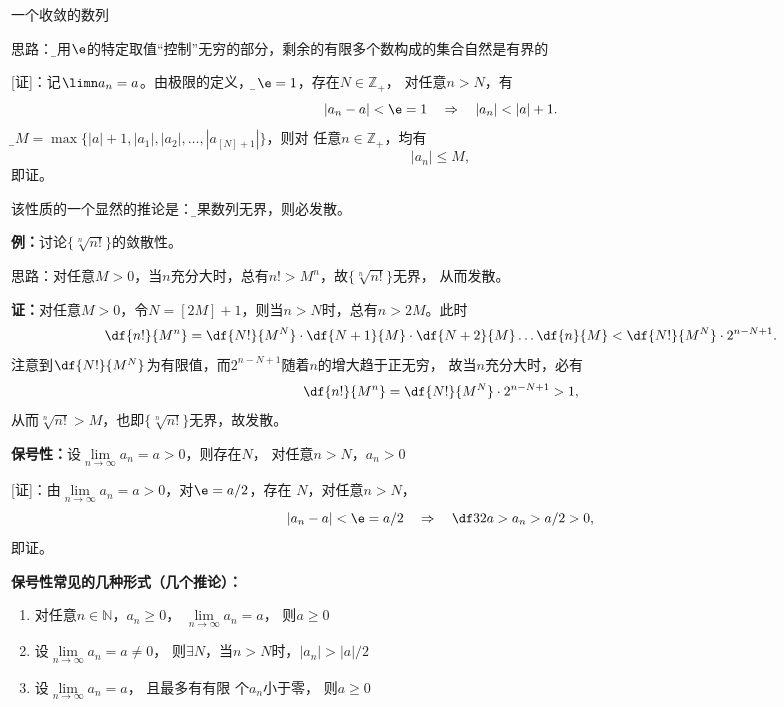 \begin{center}
	
	一个收敛的数列
\end{center}

思路：{\b 利用$\e$的特定取值“控制”无穷的部分，剩余的有限多个数构成的集合自然是有界的}

[证]：记$\limn a_n=a$。由极限的定义，对{\b$\e=1$}，存在$N\in\mathbb{Z}_+$，
对任意$n>N$，有
$$|a_n-a|<\e=1\quad\Rightarrow\quad |a_n|<|a|+1.$$
记{\b$M=\max\{|a|+1,|a_1|,|a_2|,\ldots,|a_{[N]+1}|\}$}，则对
任意$n\in\mathbb{Z}_+$，均有
$$|a_n|\leq M,$$
即证。

该性质的一个显然的推论是：{\b 如果数列无界，则必发散。}

{\bf 例：}讨论$\{\sqrt[n]{n!}\}$的敛散性。

思路：对任意$M>0$，当$n$充分大时，总有$n!>M^n$，故$\{\sqrt[n]{n!}\}$无界，
从而发散。

{\bf 证：}对任意$M>0$，令$N=[2M]+1$，则当$n>N$时，总有$n>2M$。此时
$$\df{n!}{M^n}=\df{N!}{M^N}\cdot\df{N+1}{M}
\cdot\df{N+2}{M}\ldots\df{n}{M}<\df{N!}{M^N}\cdot2^{n-N+1}.$$
注意到$\df{N!}{M^N}$为有限值，而$2^{n-N+1}$随着$n$的增大趋于正无穷，
故当$n$充分大时，必有
$$\df{n!}{M^n}=\df{N!}{M^N}\cdot2^{n-N+1}>1,$$
从而$\sqrt[n]{n!}>M$，也即$\{\sqrt[n]{n!}\}$无界，故发散。

{\bf 保号性：}设$\lim\limits_{n\to\infty}a_n=a>0$，则存在$N$，
对任意$n>N$，$a_n>0$

[证]：由$\lim\limits_{n\to\infty}a_n=a>0$，对$\e=a/2$，存在
$N$，对任意$n>N$，
$$|a_n-a|<\e=a/2\quad\Rightarrow\quad \df32a>a_n>a/2>0,$$
即证。
		
{\bf 保号性常见的几种形式（几个推论）：}
\begin{enumerate}
  \setlength{\itemindent}{1cm}
  \item 对任意$n\in\mathbb{N}$，$a_n\geq
  0$， $\lim\limits_{n\to\infty}a_n=a$， 则$a\geq 0$
  \item 设$\lim\limits_{n\to\infty}a_n=a\ne
  0$， 则$\exists N$，当$n>N$时，$|a_n|>|a|/2$
  \item  设$\lim\limits_{n\to\infty}a_n=a$， 且最多有有限
  个$a_n$小于零， 则$a\geq 0$
\end{enumerate}	

